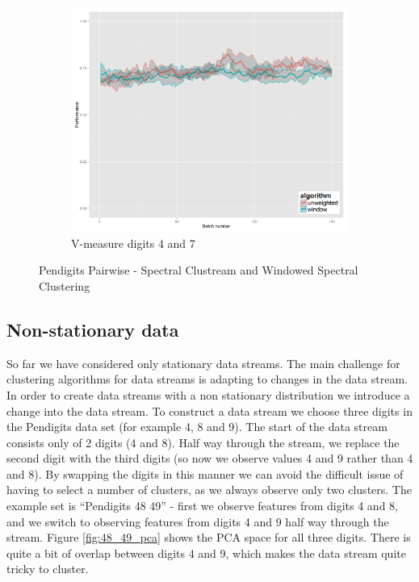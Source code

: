 \begin{figure}[H]
\begin{subfigure}{.3\textwidth}
  \includegraphics[width=\linewidth]{pendigits_2_alg/uci_pendigits_47_ci_one_size_vmeasure.png}
  \caption{V-measure digits 4 and 7}
\end{subfigure}
\caption{Pendigits Pairwise - Spectral Clustream and Windowed Spectral Clustering}
\label{fig:uci_pendigits}
\end{figure}

\subsection{Non-stationary data}
\label{sec:non_stationary}

So far we have considered only stationary data streams. The main challenge for clustering algorithms for data streams is adapting to changes in the data stream. In order to create data streams with a non stationary distribution we introduce a change into the data stream. To construct a data stream we choose three digits in the Pendigits data set (for example 4, 8 and 9). The start of the data stream consists only of 2 digits (4 and 8). Half way through the stream, we replace  the second digit with the third digits (so now we observe values 4 and 9 rather than 4 and 8). By swapping the digits in this manner we can avoid the difficult issue of having to select a number of clusters, as we always observe only two clusters.  The example set is ``Pendigits 48 49'' - first we observe features from digits 4 and 8, and we switch to observing features from digits 4 and 9 half way through the stream. Figure \ref{fig:48_49_pca} shows the PCA space for all  three digits. There is quite a bit of overlap between digits 4 and 9, which makes the data stream quite tricky to cluster. 

